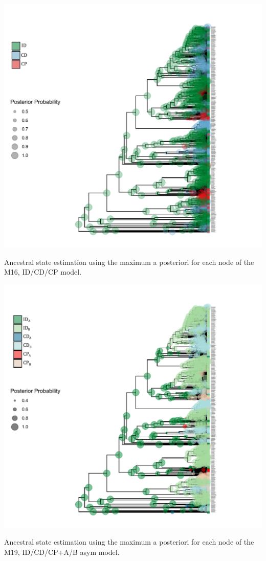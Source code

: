 \begin{suppfigure}
\includegraphics[width=\textwidth]{asrIDCDCP.pdf}
\caption{Ancestral state estimation using the maximum a posteriori for each node of the  M16, ID/CD/CP model.} %
\label{suppfigure:IDCDCPnodipasr}
\end{suppfigure}



\begin{suppfigure}
\includegraphics[width=\textwidth]{asrIDCDCPAB.pdf}
\caption{Ancestral state estimation using the maximum a posteriori for each node of the  M19, ID/CD/CP+A/B asym model.} %
\label{suppfigure:IDCDCPnodipABasr}
\end{suppfigure}



